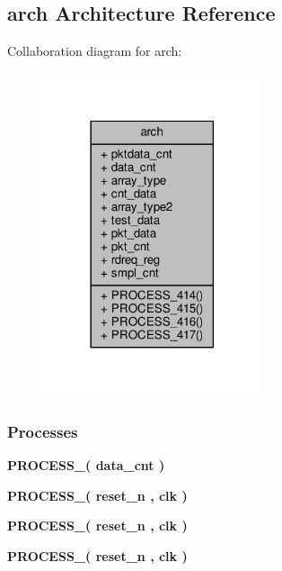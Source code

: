 \subsection{arch Architecture Reference}
\label{classpkt__tester_1_1arch}


Collaboration diagram for arch\+:\nopagebreak
\begin{figure}[H]
\begin{center}
\leavevmode
\includegraphics[width=182pt]{d7/d07/classpkt__tester_1_1arch__coll__graph}
\end{center}
\end{figure}
\subsubsection*{Processes}
 \begin{DoxyCompactItemize}
\item 
{\bf P\+R\+O\+C\+E\+S\+S\+\_}{\bfseries  ( {\bfseries {\bfseries {\bf data\+\_\+cnt}} \textcolor{vhdlchar}{ }} )}
\item 
{\bf P\+R\+O\+C\+E\+S\+S\+\_}{\bfseries  ( {\bfseries {\bfseries {\bf reset\+\_\+n}} \textcolor{vhdlchar}{ }} , {\bfseries {\bfseries {\bf clk}} \textcolor{vhdlchar}{ }} )}
\item 
{\bf P\+R\+O\+C\+E\+S\+S\+\_}{\bfseries  ( {\bfseries {\bfseries {\bf reset\+\_\+n}} \textcolor{vhdlchar}{ }} , {\bfseries {\bfseries {\bf clk}} \textcolor{vhdlchar}{ }} )}
\item 
{\bf P\+R\+O\+C\+E\+S\+S\+\_}{\bfseries  ( {\bfseries {\bfseries {\bf reset\+\_\+n}} \textcolor{vhdlchar}{ }} , {\bfseries {\bfseries {\bf clk}} \textcolor{vhdlchar}{ }} )}
\end{DoxyCompactItemize}
